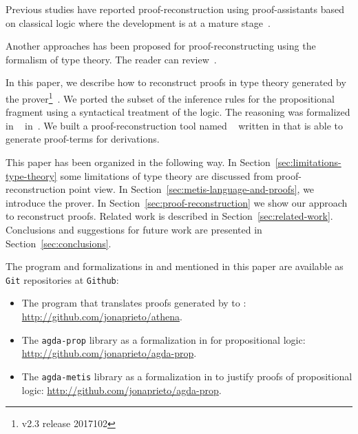\documentclass[../main.tex]{subfiles}
\begin{document}
Previous studies have reported proof-reconstruction using proof-assistants
based on classical logic where the development is at a
mature stage~\cite{paulson2010three,hurlin07practical,kaliszyk2013}.

Another approaches has been proposed for proof-reconstructing using
the formalism of type theory.
The reader can review~\cite{Bezem2002,armand2011,Ekici2017,kanso2016light}.

In this paper, we describe how to reconstruct proofs in type theory
generated by the \Metis prover\footnote{v2.3 release 2017102}~\cite{hurd2003first}.
We ported the subset of the \Metis inference rules for the propositional
fragment using a syntactical treatment of the logic. The \Metis reasoning was
formalized in \Agda~\cite{agdateam} in~\cite{AgdaProp,AgdaMetis}. We built a
proof-reconstruction tool named \Athena~\cite{Athena} written in \Haskell
that is able to generate \Agda proof-terms for \Metis derivations.

This paper has been organized in the following way.
In Section~\ref{sec:limitations-type-theory} some limitations of type theory
are discussed from proof-reconstruction point view.
In Section~\ref{sec:metis-language-and-proofs}, we introduce the
\Metis prover.
In Section~\ref{sec:proof-reconstruction} we show our
approach to reconstruct \Metis proofs.
Related work is described in Section~\ref{sec:related-work}.
Conclusions and suggestions for future work are  presented in
Section~\ref{sec:conclusions}.


The program and formalizations in \Agda and \Haskell mentioned in this paper are available
as \verb!Git! repositories at \verb!Github!:

\begin{itemize}
  \item The \Athena program that translates proofs generated by \Metis to \Agda:
  \url{http://github.com/jonaprieto/athena}.
  \item The \verb!agda-prop! library as a formalization in \Agda for propositional logic:
  \url{http://github.com/jonaprieto/agda-prop}.
  \item The \verb!agda-metis! library as a formalization in \Agda to justify \Metis proofs of propositional
  logic:
  \url{http://github.com/jonaprieto/agda-prop}.
\end{itemize}
\end{document}
